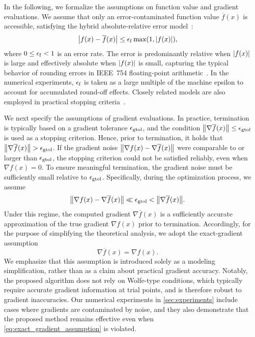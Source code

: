 \documentclass[journal]{subfiles}
\begin{document}
In the following, we formalize the assumptions on function value and gradient evaluations.
We assume that only an error-contaminated function value $\overline{f}(x)$ is accessible, satisfying the hybrid absolute-relative error model~\citep{highamAccuracyStabilityNumerical2002,10.5555/3168451.3168462}:
\begin{equation}\label{eq:error_model}
    \abs{f(x)-\overline{f}(x)} \le \epsilon_\mathrm{f} \max(1,\abs{f(x)}),
\end{equation}
where $0 \le \epsilon_\mathrm{f} < 1$ is an error rate.
The error is predominantly relative when $\abs{f(x)}$ is large and effectively absolute when $\abs{f(x)}$ is small, capturing the typical behavior of rounding errors in IEEE~754 floating-point arithmetic~\citep{highamAccuracyStabilityNumerical2002}.
In the numerical experiments, $\epsilon_\mathrm{f}$ is taken as a large multiple of the machine epsilon to account for accumulated round-off effects.
Closely related models are also employed in practical stopping criteria~\citep{2020SciPy-NMeth}.

We next specify the assumptions of gradient evaluations.
In practice, termination is typically based on a gradient tolerance $\epsilon_{\mathrm{gtol}}$, and the condition $\norm{\nabla \overline{f}(x)} \le \epsilon_{\mathrm{gtol}}$ is used as a stopping criterion.
Hence, prior to termination, it holds that $\norm{\nabla \overline{f}(x)} > \epsilon_{\mathrm{gtol}}$.
If the gradient noise $\norm{\nabla f(x) - \nabla \overline{f}(x)}$ were comparable to or larger than $\epsilon_{\mathrm{gtol}}$, the stopping criterion could not be satisfied reliably, even when $\nabla f(x) = 0$. To ensure meaningful termination, the gradient noise must be sufficiently small relative to $\epsilon_{\mathrm{gtol}}$. Specifically, during the optimization process, we assume
\begin{equation*}
    \norm{\nabla f(x) - \nabla \overline{f}(x)} \ll \epsilon_{\mathrm{gtol}} < \norm{\nabla \overline{f}(x)}.
\end{equation*}
Under this regime, the computed gradient $\nabla \overline{f}(x)$ is a sufficiently accurate approximation of the true gradient $\nabla f(x)$ prior to termination. Accordingly, for the purpose of simplifying the theoretical analysis, we adopt the exact-gradient assumption
\begin{equation}\label{eq:exact_gradient_assumption}
    \nabla \overline{f}(x) = \nabla f(x).
\end{equation}
We emphasize that this assumption is introduced solely as a modeling simplification, rather than as a claim about practical gradient accuracy.
Notably, the proposed algorithm does not rely on Wolfe-type conditions, which typically require accurate gradient information at trial points, and is therefore robust to gradient inaccuracies.
Our numerical experiments in \cref{sec:experiments} include cases where gradients are contaminated by noise, and they also demonstrate that the proposed method remains effective even when \cref{eq:exact_gradient_assumption} is violated.
\end{document}
